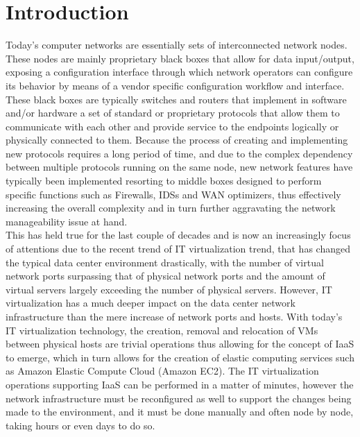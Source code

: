 
\chapter{Introduction}
\label{chapter:introduction}
Today's computer networks are essentially sets of interconnected network nodes. 
These nodes are mainly proprietary black boxes that allow for data input/output, exposing a configuration interface through which network operators can configure its behavior by means of a vendor specific configuration workflow and interface.
These black boxes are typically switches and routers that implement in software and/or hardware a set of standard or proprietary protocols that allow them to communicate with each other and provide service to the endpoints logically or physically connected to them.
Because the process of creating and implementing new protocols requires a long period of time, and due to the complex dependency between multiple protocols running on the same node, new network features have typically been implemented resorting to middle boxes designed to perform specific functions such as Firewalls, \glspl{IDS} and \gls{WAN} optimizers, thus effectively increasing the overall complexity and in turn further aggravating the network manageability issue at hand.\\
%
This has held true for the last couple of decades and is now an increasingly focus of attentions due to the recent trend of \gls{IT} virtualization trend, that has changed the typical data center environment drastically, with the number of virtual network ports surpassing that of physical network ports and the amount of virtual servers largely exceeding the number of physical servers\cite{Kreutz2014}.
However, \gls{IT} virtualization has a much deeper impact on the data center network infrastructure than the mere increase of network ports and hosts.
With today's \gls{IT} virtualization technology, the creation, removal and relocation of \glspl{VM} between physical hosts are trivial operations thus allowing for the concept of \gls{IaaS} to emerge, which in turn allows for the creation of elastic computing services\cite{Kreutz2014} such as Amazon Elastic Compute Cloud (Amazon EC2)\cite{AmazonEC2}.
The \gls{IT} virtualization operations supporting \gls{IaaS} can be performed in a matter of minutes, however the network infrastructure must be reconfigured as well to support the changes being made to the environment, and it must be done manually and often node by node, taking hours or even days to do so.\\
